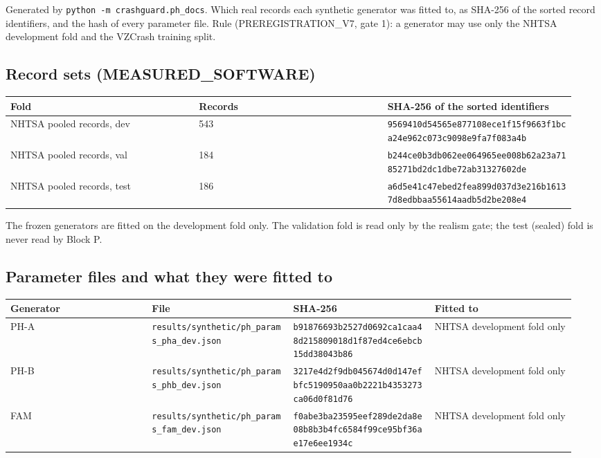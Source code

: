 


Generated by \texttt{python -m crashguard.ph\_docs}. Which real records each synthetic generator was fitted to, as SHA-256 of the sorted record identifiers, and the hash of every parameter file. Rule (PREREGISTRATION\_V7, gate 1): a generator may use only the NHTSA development fold and the VZCrash training split.

\subsection*{Record sets (MEASURED\_SOFTWARE)}

{\scriptsize\raggedright
\begin{longtable}{p{0.317\linewidth}p{0.317\linewidth}p{0.317\linewidth}}
\toprule
Fold & Records & SHA-256 of the sorted identifiers \\
\midrule
\endhead
NHTSA pooled records, dev & 543 & \texttt{9569410d54565e877108ece1f15f9663f1bca24e962c073c9098e9fa7f083a4b} \\
NHTSA pooled records, val & 184 & \texttt{b244ce0b3db062ee064965ee008b62a23a7185271bd2dc1dbe72ab31327602de} \\
NHTSA pooled records, test & 186 & \texttt{a6d5e41c47ebed2fea899d037d3e216b16137d8edbbaa55614aadb5d2be208e4} \\
\bottomrule
\end{longtable}}

The frozen generators are fitted on the development fold only. The validation fold is read only by the realism gate; the test (sealed) fold is never read by Block P.

\subsection*{Parameter files and what they were fitted to}

{\scriptsize\raggedright
\begin{longtable}{p{0.237\linewidth}p{0.237\linewidth}p{0.237\linewidth}p{0.237\linewidth}}
\toprule
Generator & File & SHA-256 & Fitted to \\
\midrule
\endhead
PH-A & \texttt{results/synthetic/ph\_params\_pha\_dev.json} & \texttt{b91876693b2527d0692ca1caa48d215809018d1f87ed4ce6ebcb15dd38043b86} & NHTSA development fold only \\
PH-B & \texttt{results/synthetic/ph\_params\_phb\_dev.json} & \texttt{3217e4d2f9db045674d0d147efbfc5190950aa0b2221b4353273ca06d0f81d76} & NHTSA development fold only \\
FAM & \texttt{results/synthetic/ph\_params\_fam\_dev.json} & \texttt{f0abe3ba23595eef289de2da8e08b8b3b4fc6584f99ce95bf36ae17e6ee1934c} & NHTSA development fold only \\
\bottomrule
\end{longtable}}

